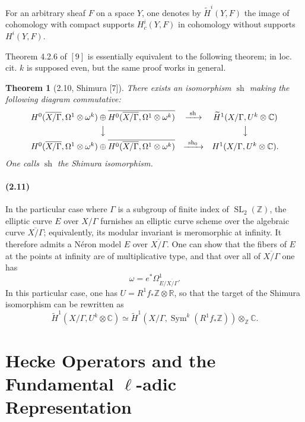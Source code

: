 \documentclass[10pt]{article}
\newcommand{\C}{\mathbb C}
\newcommand{\R}{\mathbb R}
\newcommand{\Z}{\mathbb Z}
\newcommand{\SL}{\operatorname{SL}}
\newcommand{\Sym}{\operatorname{Sym}}
\newcommand{\sh}{\operatorname{sh}}
\newtheorem*{theorem}{Theorem}
\begin{document}
For an arbitrary sheaf $F$ on a space $Y$, one denotes by
$\widetilde H^i(Y,F)$ the image of cohomology with compact supports
$H^i_c(Y,F)$ in cohomology without supports $H^i(Y,F)$.

Theorem 4.2.6 of \([9]\) is essentially equivalent to the following theorem; in loc. cit.
$k$ is supposed even, but the same proof works in general.

\begin{theorem}[2.10, Shimura {\rm [7]}]
There exists an isomorphism $\sh$ making the following diagram commutative:
\[
\begin{array}{ccc}
H^0(\overline{X/\Gamma},\Omega^1\otimes\omega^k)\oplus
\overline{H^0(\overline{X/\Gamma},\Omega^1\otimes\omega^k)}
& \xrightarrow{\ \sh\ } &
\widetilde H^1(X/\Gamma,U^k\otimes\C)
\\[0.4em]
\big\downarrow && \big\downarrow
\\[0.4em]
H^0(\overline{X/\Gamma},\Omega^1\otimes\omega^k)\oplus
\overline{H^0(\overline{X/\Gamma},\Omega^1\otimes\omega^k)}
& \xrightarrow{\ \sh_0\ } &
H^1(X/\Gamma,U^k\otimes\C).
\end{array}
\]
One calls $\sh$ the Shimura isomorphism.
\end{theorem}

\paragraph{(2.11)}
In the particular case where $\Gamma$ is a subgroup of finite index of $\SL_2(\Z)$, the
elliptic curve $E$ over $X/\Gamma$ furnishes an elliptic curve scheme over the algebraic
curve $\overline{X/\Gamma}$; equivalently, its modular invariant is meromorphic at infinity.
It therefore admits a Néron model $E$ over $\overline{X/\Gamma}$. One can show that the
fibers of $E$ at the points at infinity are of multiplicative type, and that over all of
$\overline{X/\Gamma}$ one has
\[
\omega=e^*\Omega^1_{E/\overline{X/\Gamma}}.
\]
In this particular case, one has $U=R^1f_*\Z\otimes\R$, so that the target of the Shimura
isomorphism can be rewritten as
\[
\widetilde H^1(X/\Gamma,U^k\otimes\C)
\simeq
\widetilde H^1(X/\Gamma,\Sym^k(R^1f_*\Z))\otimes_\Z\C .
\]

\section{Hecke Operators and the Fundamental $\ell$-adic Representation}
\end{document}
